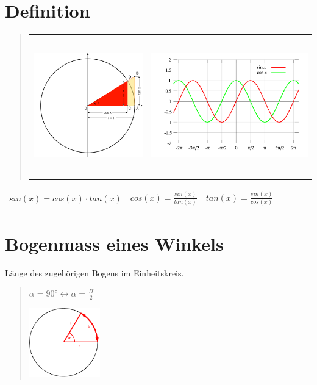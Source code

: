 \section*{Definition}
\begin{verse}
\begin{tabular}{ll}
\includegraphics[height=6cm]{Repetition/Einheitskreis} & \includegraphics[height=6cm]{Repetition/Sin_Cos}\tabularnewline
\end{tabular}
\end{verse}
\begin{tabular}{|c|c|c|}
\hline 
$sin(x)=cos(x)\cdot tan(x)$ & $cos(x)=\frac{sin(x)}{tan(x)}$ & $tan(x)=\frac{sin(x)}{cos(x)}$\tabularnewline
\hline 
\end{tabular}


\section*{Bogenmass eines Winkels}

Länge des zugehörigen Bogens im Einheitskreis.
\begin{verse}
$\alpha=90\text{°}\leftrightarrow\alpha=\frac{\Pi}{2}$

\includegraphics[height=3cm]{Repetition/Bogenmass}
\end{verse}

